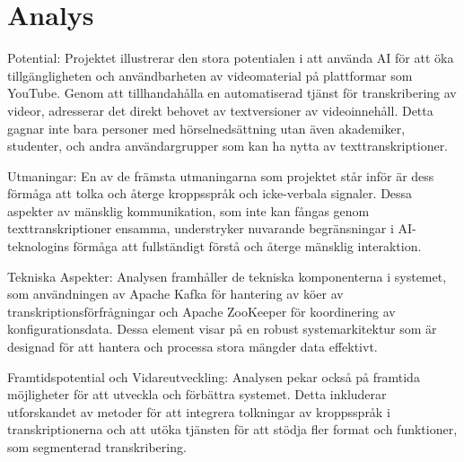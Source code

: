 \chapter{Analys}
Potential: Projektet illustrerar den stora potentialen i att använda AI för att öka tillgängligheten och användbarheten av videomaterial på plattformar som YouTube. Genom att tillhandahålla en automatiserad tjänst för transkribering av videor, adresserar det direkt behovet av textversioner av videoinnehåll. Detta gagnar inte bara personer med hörselnedsättning utan även akademiker, studenter, och andra användargrupper som kan ha nytta av texttranskriptioner.

Utmaningar: En av de främsta utmaningarna som projektet står inför är dess förmåga att tolka och återge kroppsspråk och icke-verbala signaler. Dessa aspekter av mänsklig kommunikation, som inte kan fångas genom texttranskriptioner ensamma, understryker nuvarande begränsningar i AI-teknologins förmåga att fullständigt förstå och återge mänsklig interaktion.

Tekniska Aspekter: Analysen framhåller de tekniska komponenterna i systemet, som användningen av Apache Kafka för hantering av köer av transkriptionsförfrågningar och Apache ZooKeeper för koordinering av konfigurationsdata. Dessa element visar på en robust systemarkitektur som är designad för att hantera och processa stora mängder data effektivt.

Framtidspotential och Vidareutveckling: Analysen pekar också på framtida möjligheter för att utveckla och förbättra systemet. Detta inkluderar utforskandet av metoder för att integrera tolkningar av kroppsspråk i transkriptionerna och att utöka tjänsten för att stödja fler format och funktioner, som segmenterad transkribering.
